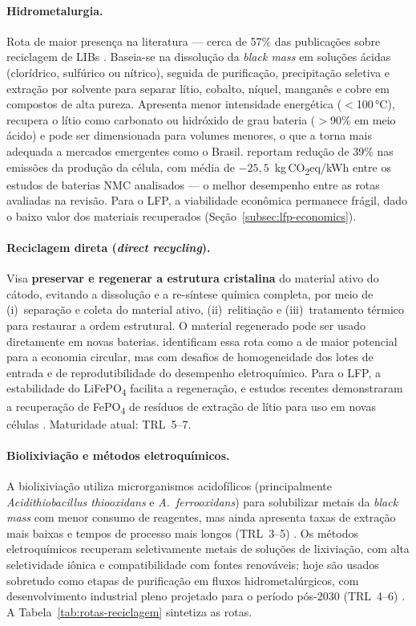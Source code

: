 \paragraph{Hidrometalurgia.}
Rota de maior presença na literatura — cerca de 57\% das publicações sobre
reciclagem de LIBs \cite{zhao2025}. Baseia-se na dissolução da \textit{black
mass} em soluções ácidas (clorídrico, sulfúrico ou nítrico), seguida de
purificação, precipitação seletiva e extração por solvente para separar lítio,
cobalto, níquel, manganês e cobre em compostos de alta pureza. Apresenta menor
intensidade energética ($<$100\,°C), recupera o lítio como carbonato ou hidróxido
de grau bateria ($>$90\% em meio ácido) e pode ser dimensionada para volumes
menores, o que a torna mais adequada a mercados emergentes como o Brasil.
 reportam redução de 39\% nas emissões da produção da
célula, com média de $-25{,}5$~kg\,CO\textsubscript{2}eq/kWh entre os estudos de
baterias NMC analisados — o melhor desempenho entre as rotas avaliadas na revisão.
Para o LFP, a viabilidade econômica permanece frágil, dado o baixo valor dos
materiais recuperados (Seção~\ref{subsec:lfp-economics}).

\paragraph{Reciclagem direta (\textit{direct recycling}).}
Visa \textbf{preservar e regenerar a estrutura cristalina} do material ativo do
cátodo, evitando a dissolução e a re-síntese química completa, por meio de
(i)~separação e coleta do material ativo, (ii)~relitiação e (iii)~tratamento
térmico para restaurar a ordem estrutural. O material regenerado pode ser usado
diretamente em novas baterias.  identificam essa rota
como a de maior potencial para a economia circular, mas com desafios de
homogeneidade dos lotes de entrada e de reprodutibilidade do desempenho
eletroquímico. Para o LFP, a estabilidade do LiFePO\textsubscript{4} facilita a
regeneração, e estudos recentes demonstraram a recuperação de
FePO\textsubscript{4} de resíduos de extração de lítio para uso em novas células
\cite{hu2024}. Maturidade atual: TRL~5--7.

\paragraph{Biolixiviação e métodos eletroquímicos.}
A biolixiviação utiliza microrganismos acidofílicos (principalmente
\textit{Acidithiobacillus thiooxidans} e \textit{A.~ferrooxidans}) para solubilizar
metais da \textit{black mass} com menor consumo de reagentes, mas ainda apresenta
taxas de extração mais baixas e tempos de processo mais longos (TRL~3--5)
\cite{balachandran2024}. Os métodos eletroquímicos recuperam seletivamente metais
de soluções de lixiviação, com alta seletividade iônica e compatibilidade com
fontes renováveis; hoje são usados sobretudo como etapas de purificação em fluxos
hidrometalúrgicos, com desenvolvimento industrial pleno projetado para o período
pós-2030 (TRL~4--6) \cite{zhu2024}. A Tabela~\ref{tab:rotas-reciclagem} sintetiza
as rotas.


